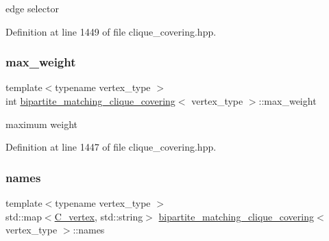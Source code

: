 edge selector 



Definition at line 1449 of file clique\+\_\+covering.\+hpp.

\mbox{\label{classbipartite__matching__clique__covering_a2e4f0f5eabc59b1bb5aa3ce3eca0b8f9}} 
\subsubsection{\texorpdfstring{max\+\_\+weight}{max\_weight}}
{\footnotesize\ttfamily template$<$typename vertex\+\_\+type $>$ \\
int \hyperlink{classbipartite__matching__clique__covering}{bipartite\+\_\+matching\+\_\+clique\+\_\+covering}$<$ vertex\+\_\+type $>$\+::max\+\_\+weight\hspace{0.3cm}{\ttfamily [private]}}



maximum weight 



Definition at line 1447 of file clique\+\_\+covering.\+hpp.

\mbox{\label{classbipartite__matching__clique__covering_a56d2fa9ed7b117a333fb86450d35fca9}} 
\subsubsection{\texorpdfstring{names}{names}}
{\footnotesize\ttfamily template$<$typename vertex\+\_\+type $>$ \\
std\+::map$<$\hyperlink{clique__covering__graph_8hpp_a9cb45047ea8c5ed95a8cfa90494345aa}{C\+\_\+vertex}, std\+::string$>$ \hyperlink{classbipartite__matching__clique__covering}{bipartite\+\_\+matching\+\_\+clique\+\_\+covering}$<$ vertex\+\_\+type $>$\+::names\hspace{0.3cm}{\ttfamily [private]}}



